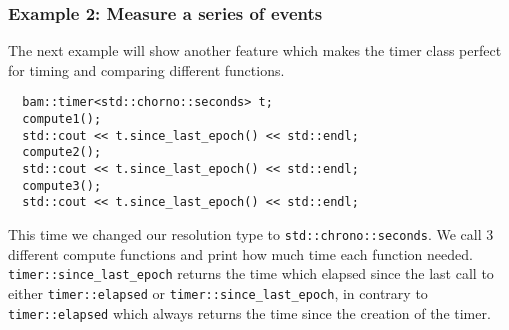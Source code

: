 \documentclass[11pt, a4paper]{article}
\begin{document}
\subsubsection{Example 2: Measure a series of events}
The next example will show another feature which makes the timer class perfect for timing and comparing different functions.

\begin{lstlisting}
  bam::timer<std::chorno::seconds> t;
  compute1();
  std::cout << t.since_last_epoch() << std::endl;
  compute2();
  std::cout << t.since_last_epoch() << std::endl;
  compute3();
  std::cout << t.since_last_epoch() << std::endl;
\end{lstlisting}

This time we changed our resolution type to \texttt{std::chrono::seconds}. We call 3 different compute functions and print how much time each function needed. \texttt{timer::since\_last\_epoch} returns the time which elapsed since the last call to either \texttt{timer::elapsed} or \texttt{timer::since\_last\_epoch}, in contrary to \texttt{timer::elapsed} which always returns the time since the creation of the timer.
\end{document}
